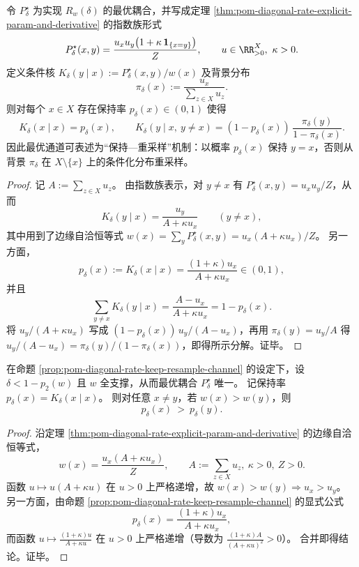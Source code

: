 \begin{proposition}[保持—重采样通道表示]\label{prop:pom-diagonal-rate-keep-resample-channel}
令 \(P^\star_\delta\) 为实现 \(R_w(\delta)\) 的最优耦合，并写成定理 \ref{thm:pom-diagonal-rate-explicit-param-and-derivative} 的指数族形式
\[
P^\star_\delta(x,y)=\frac{u_xu_y\bigl(1+\kappa\,\mathbf 1_{\{x=y\}}\bigr)}{Z},
\qquad
u\in\RR_{>0}^X,\ \kappa>0.
\]
定义条件核 \(K_\delta(y\mid x):=P^\star_\delta(x,y)/w(x)\) 及背景分布
\[
\pi_\delta(x):=\frac{u_x}{\sum_{z\in X}u_z}.
\]
则对每个 \(x\in X\) 存在保持率 \(p_\delta(x)\in(0,1)\) 使得
\[
K_\delta(x\mid x)=p_\delta(x),\qquad
K_\delta(y\mid x,\ y\ne x)=(1-p_\delta(x))\,\frac{\pi_\delta(y)}{1-\pi_\delta(x)}.
\]
因此最优通道可表述为“保持—重采样”机制：以概率 \(p_\delta(x)\) 保持 \(y=x\)，否则从背景 \(\pi_\delta\) 在 \(X\setminus\{x\}\) 上的条件化分布重采样。
\end{proposition}
\begin{proof}
记 \(A:=\sum_{z\in X}u_z\)。
由指数族表示，对 \(y\ne x\) 有 \(P^\star_\delta(x,y)=u_xu_y/Z\)，从而
\[
K_\delta(y\mid x)=\frac{u_y}{A+\kappa u_x}\qquad(y\ne x),
\]
其中用到了边缘自洽恒等式 \(w(x)=\sum_y P^\star_\delta(x,y)=u_x(A+\kappa u_x)/Z\)。
另一方面，
\[
p_\delta(x):=K_\delta(x\mid x)
=\frac{(1+\kappa)u_x}{A+\kappa u_x}\in(0,1),
\]
并且
\[
\sum_{y\ne x}K_\delta(y\mid x)=\frac{A-u_x}{A+\kappa u_x}=1-p_\delta(x).
\]
将 \(u_y/(A+\kappa u_x)\) 写成 \((1-p_\delta(x))\,u_y/(A-u_x)\)，再用 \(\pi_\delta(y)=u_y/A\) 得
\(
u_y/(A-u_x)=\pi_\delta(y)/(1-\pi_\delta(x))
\)，即得所示分解。证毕。
\end{proof}

\begin{proposition}[保持率沿边缘质量单调]\label{prop:pom-diagonal-rate-keep-probability-monotone}
在命题 \ref{prop:pom-diagonal-rate-keep-resample-channel} 的设定下，设 \(\delta<1-p_2(w)\) 且 \(w\) 全支撑，从而最优耦合 \(P^\star_\delta\) 唯一。
记保持率 \(p_\delta(x)=K_\delta(x\mid x)\)。
则对任意 \(x\ne y\)，若 \(w(x)>w(y)\)，则
\[
p_\delta(x)\ >\ p_\delta(y).
\]
\end{proposition}
\begin{proof}
沿定理 \ref{thm:pom-diagonal-rate-explicit-param-and-derivative} 的边缘自洽恒等式，
\[
w(x)=\frac{u_x(A+\kappa u_x)}{Z},
\qquad
A:=\sum_{z\in X}u_z,\ \kappa>0,\ Z>0.
\]
函数 \(u\mapsto u(A+\kappa u)\) 在 \(u>0\) 上严格递增，故 \(w(x)>w(y)\Rightarrow u_x>u_y\)。
另一方面，由命题 \ref{prop:pom-diagonal-rate-keep-resample-channel} 的显式公式
\[
p_\delta(x)=\frac{(1+\kappa)u_x}{A+\kappa u_x},
\]
而函数 \(u\mapsto \frac{(1+\kappa)u}{A+\kappa u}\) 在 \(u>0\) 上严格递增（导数为 \(\frac{(1+\kappa)A}{(A+\kappa u)^2}>0\)）。
合并即得结论。证毕。
\end{proof}


